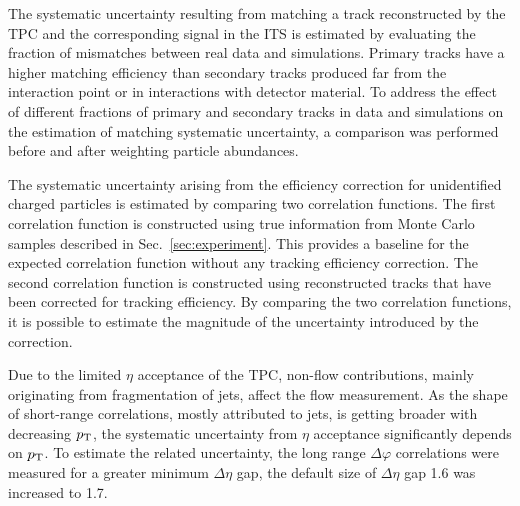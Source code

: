 The systematic uncertainty resulting from matching a track reconstructed by the TPC and the corresponding signal in the ITS is estimated by evaluating the fraction of mismatches between real data and simulations. Primary tracks have a higher matching efficiency than secondary tracks produced far from the interaction point or in interactions with detector material. To address the effect of different fractions of primary and secondary tracks in data and simulations on the estimation of matching systematic uncertainty, a comparison was performed before and after weighting particle abundances.

The systematic uncertainty arising from the efficiency correction for unidentified charged particles is estimated by comparing two correlation functions. The first correlation function is constructed using true information from Monte Carlo samples described in Sec.~\ref{sec:experiment}. This provides a baseline for the expected correlation function without any tracking efficiency correction. The second correlation function is constructed using reconstructed tracks that have been corrected for tracking efficiency. By comparing the two correlation functions, it is possible to estimate the magnitude of the uncertainty introduced by the correction. 

Due to the limited $\eta$ acceptance of the TPC, non-flow contributions, mainly originating from fragmentation of jets, affect the flow measurement. As the shape of short-range correlations, mostly attributed to jets, is getting broader with decreasing $p_\mathrm{T}$, the systematic uncertainty from $\eta$ acceptance significantly depends on $p_{\rm{T}}$. To estimate the related uncertainty, the long range $\Delta\varphi$ correlations were measured for a greater minimum $\Delta\eta$ gap, the default size of $\Delta\eta$ gap 1.6 was increased to 1.7.

